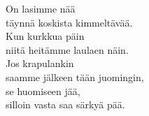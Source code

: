 
On lasimme nää \\ täynnä koskista kimmeltävää. \\ Kun kurkkua päin \\ niitä heitämme laulaen näin. \\ Jos krapulankin \\ saamme jälkeen tään juomingin, \\ se huomiseen jää, \\ silloin vasta saa särkyä pää.